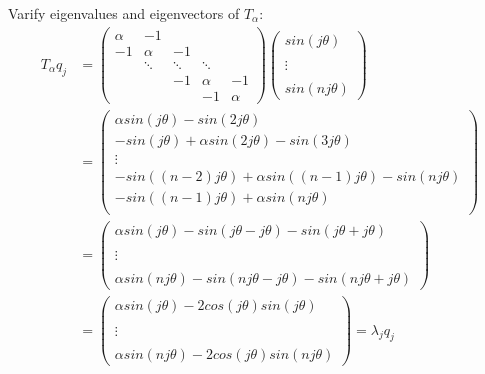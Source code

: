 \begin{SolutionSheet}[\ref{sheet6}]
\begin{onehalfspace}
  \begin{Solution} Varify eigenvalues and eigenvectors of $T_{\alpha}$: \\
    \begin{align*}
      T_{\alpha} q_j &=  \begin{pmatrix}
        \alpha &     -1 &        &        & \\
            -1 & \alpha &     -1 &        & \\
              & \ddots & \ddots & \ddots & \\
              &        &     -1 & \alpha &     -1 \\
              &        &        &     -1 & \alpha
      \end{pmatrix} \begin{pmatrix}
        sin(j\theta) \\ 
        \\
        \vdots\\
        \\
        sin(nj\theta)
      \end{pmatrix} \\
      &= \begin{pmatrix}
        \alpha sin(j\theta) - sin(2j \theta) \\
        -sin(j \theta) + \alpha sin(2j\theta) - sin(3j \theta)\\
        \vdots \\
        -sin((n-2)j \theta) + \alpha sin((n-1)j\theta) - sin(n j \theta)\\
        -sin((n-1)j \theta) + \alpha sin(n j \theta)\\
      \end{pmatrix} \\
      &= \begin{pmatrix}
        \alpha sin(j\theta) - sin(j\theta - j\theta) - sin(j\theta + j\theta) \\
        \\
        \vdots \\
        \\
        \alpha sin(nj\theta) - sin(nj\theta - j\theta) - sin(nj\theta + j\theta)
      \end{pmatrix} \\
      &= \begin{pmatrix}
        \alpha sin(j\theta) - 2 cos(j\theta)sin(j \theta) \\
        \\
        \vdots \\
        \\
        \alpha sin(nj \theta) - 2 cos(j\theta) sin(nj\theta)
      \end{pmatrix} = \lambda_j q_j 
    \end{align*}
  \end{Solution}


\end{onehalfspace}
\end{SolutionSheet}
